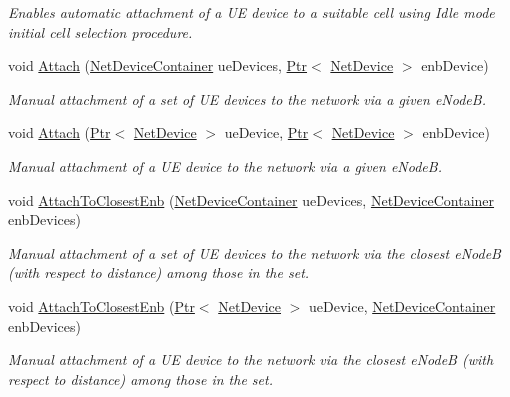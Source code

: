 \begin{DoxyCompactItemize}
\begin{DoxyCompactList}\small\item\em Enables automatic attachment of a UE device to a suitable cell using Idle mode initial cell selection procedure. \end{DoxyCompactList}\item 
void \hyperlink{classns3_1_1LteHelper_a4a7c7da76f4cbcb83bafc73c90f1d270}{Attach} (\hyperlink{classns3_1_1NetDeviceContainer}{Net\+Device\+Container} ue\+Devices, \hyperlink{classns3_1_1Ptr}{Ptr}$<$ \hyperlink{classns3_1_1NetDevice}{Net\+Device} $>$ enb\+Device)
\begin{DoxyCompactList}\small\item\em Manual attachment of a set of UE devices to the network via a given e\+NodeB. \end{DoxyCompactList}\item 
void \hyperlink{classns3_1_1LteHelper_a3af3eafe55de9d7e251a1642bbc3d613}{Attach} (\hyperlink{classns3_1_1Ptr}{Ptr}$<$ \hyperlink{classns3_1_1NetDevice}{Net\+Device} $>$ ue\+Device, \hyperlink{classns3_1_1Ptr}{Ptr}$<$ \hyperlink{classns3_1_1NetDevice}{Net\+Device} $>$ enb\+Device)
\begin{DoxyCompactList}\small\item\em Manual attachment of a UE device to the network via a given e\+NodeB. \end{DoxyCompactList}\item 
void \hyperlink{classns3_1_1LteHelper_af1e68c53f22b705f1c41753558240999}{Attach\+To\+Closest\+Enb} (\hyperlink{classns3_1_1NetDeviceContainer}{Net\+Device\+Container} ue\+Devices, \hyperlink{classns3_1_1NetDeviceContainer}{Net\+Device\+Container} enb\+Devices)
\begin{DoxyCompactList}\small\item\em Manual attachment of a set of UE devices to the network via the closest e\+NodeB (with respect to distance) among those in the set. \end{DoxyCompactList}\item 
void \hyperlink{classns3_1_1LteHelper_a53c58a26c1e017b8116e86d82d5897bb}{Attach\+To\+Closest\+Enb} (\hyperlink{classns3_1_1Ptr}{Ptr}$<$ \hyperlink{classns3_1_1NetDevice}{Net\+Device} $>$ ue\+Device, \hyperlink{classns3_1_1NetDeviceContainer}{Net\+Device\+Container} enb\+Devices)
\begin{DoxyCompactList}\small\item\em Manual attachment of a UE device to the network via the closest e\+NodeB (with respect to distance) among those in the set. \end{DoxyCompactList}\item 

\end{DoxyCompactItemize}
